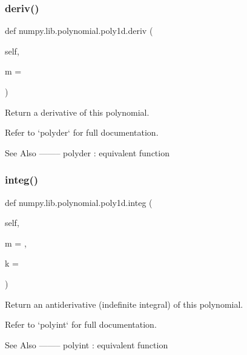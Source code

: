 \mbox{\label{classnumpy_1_1lib_1_1polynomial_1_1poly1d_a7ea6d16d9d0e476669008d943aaa6ce6}} 
\subsubsection{\texorpdfstring{deriv()}{deriv()}}
{\footnotesize\ttfamily def numpy.\+lib.\+polynomial.\+poly1d.\+deriv (\begin{DoxyParamCaption}\item[{}]{self,  }\item[{}]{m = {} }\end{DoxyParamCaption})}

\begin{DoxyVerb}Return a derivative of this polynomial.

Refer to `polyder` for full documentation.

See Also
--------
polyder : equivalent function\end{DoxyVerb}
 \mbox{\label{classnumpy_1_1lib_1_1polynomial_1_1poly1d_af77837d401a22d0cd55d219b485d4078}} 
\subsubsection{\texorpdfstring{integ()}{integ()}}
{\footnotesize\ttfamily def numpy.\+lib.\+polynomial.\+poly1d.\+integ (\begin{DoxyParamCaption}\item[{}]{self,  }\item[{}]{m = {},  }\item[{}]{k = {} }\end{DoxyParamCaption})}

\begin{DoxyVerb}Return an antiderivative (indefinite integral) of this polynomial.

Refer to `polyint` for full documentation.

See Also
--------
polyint : equivalent function\end{DoxyVerb}
 \mbox{\label{classnumpy_1_1lib_1_1polynomial_1_1poly1d_a5d331fa8030de4849acd2c6f7e3f1c49}} 
